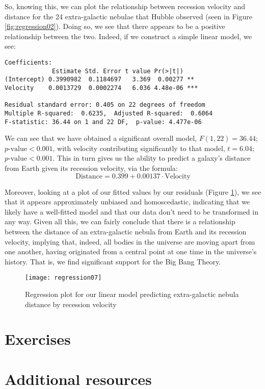 So, knowing this, we can plot the relationship between recession velocity and distance for the 24 extra-galactic nebulae that Hubble observed (seen in Figure \ref{fig:regression02}). Doing so, we see that there appears to be a positive relationship between the two. Indeed, if we construct a simple linear model, we see:

\begin{framed}
\begin{Verbatim}[samepage=TRUE]
Coefficients:
             Estimate Std. Error t value Pr(>|t|)    
(Intercept) 0.3990982  0.1184697   3.369  0.00277 ** 
Velocity    0.0013729  0.0002274   6.036 4.48e-06 ***

Residual standard error: 0.405 on 22 degrees of freedom
Multiple R-squared:  0.6235,  Adjusted R-squared:  0.6064 
F-statistic: 36.44 on 1 and 22 DF,  p-value: 4.477e-06
\end{Verbatim}
\end{framed}

We can see that we have obtained a significant overall model, $F(1,22) = 36.44$; $p\text{-value}<0.001$, with velocity contributing significantly to that model, $t=6.04$; $p\text{-value}<0.001$. This in turn gives us the ability to predict a galaxy's distance from Earth given its recession velocity, via the formula:
\begin{equation*}
\text{Distance}=0.399+0.00137\cdot\text{Velocity}
\end{equation*}

Moreover, looking at a plot of our fitted values by our residuals (Figure \ref{fig:regression07}), we see that it appears approximately unbiased and homoscedastic, indicating that we likely have a well-fitted model and that our data don't need to be transformed in any way. Given all this, we can fairly conclude that there is a relationship between the distance of an extra-galactic nebula from Earth and its recession velocity, implying that, indeed, all bodies in the universe are moving apart from one another, having originated from a central point at one time in the universe's history. That is, we find significant support for the Big Bang Theory.

\begin{figure}[htp]
\texttt{[image: regression07]}
\caption{Regression plot for our linear model predicting extra-galactic nebula distance by recession velocity}
\label{fig:regression07}
\end{figure}
\section{Exercises}

\section{Additional resources}